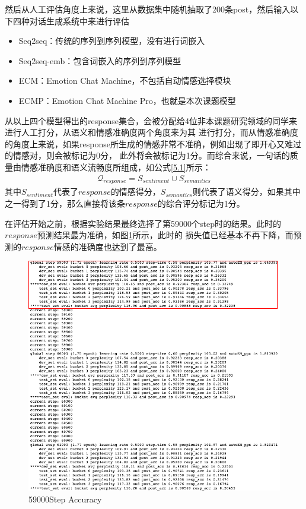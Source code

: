 \documentclass[supercite]{HustGraduPaper}
\theoremstyle{definition}
\begin{document}
然后从人工评估角度上来说，这里从数据集中随机抽取了200条post，然后输入以下四种对话生成系统中来进行评估
\begin{itemize}
  \item [1)]Seq2seq：传统的序列到序列模型，没有进行词嵌入
  \item [2)]Seq2seq-emb：包含词嵌入的序列到序列模型
  \item [3)]ECM：Emotion Chat Machine，不包括自动情感选择模块
  \item [4)]ECMP：Emotion Chat Machine Pro，也就是本次课题模型
\end{itemize}
从以上四个模型得出的response集合，会被分配给4位非本课题研究领域的同学来进行人工打分，从语义和情感准确度两个角度来为其
进行打分，而从情感准确度的角度上来说，如果response所生成的情感非常不准确，例如出现了即开心又难过的情感对，则会被标记为0分，
此外将会被标记为1分。而综合来说，一句话的质量由情感准确度和语义流畅度所组成，如公式\ref{5.1}所示：
\begin{align}
  \mathcal{Q}_{response} = S_{sentiment} \cup S_{semantics} \label{5.1}
\end{align}
其中$S_{sentiment}$代表了$response$的情感得分，$S_{semantics}$则代表了语义得分，如果其中之一得到了1分，那么直接将该条$response$的综合评分标记为1分。

在评估开始之前，根据实验结果最终选择了第59000个step时的结果。此时的$response$预测结果最为准确，如图\ref{Fig.59000}所示，此时的
损失值已经基本不再下降，而预测的$response$情感的准确度也达到了最高。

\begin{figure}[H] %
  \centering %
  \includegraphics[width=1\textwidth]{images/59000.png} %
  \caption{59000Step Accuracy} %
  \label{Fig.59000} %
\end{figure}
\end{document}
